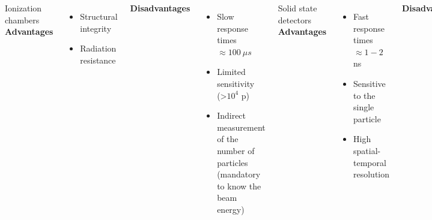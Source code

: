 \documentclass[aspectratio=169]{beamer}
\begin{document}
\begin{frame}
\begin{columns}
\begin{center}
			\end{center}
			{\color{blue} Ionization chambers}
			\newline
			\textbf{Advantages}
			\begin{itemize}
				\item Structural integrity
				\item Radiation resistance
			\end{itemize}
			\textbf{Disadvantages}
			\begin{itemize}
				\item Slow response times $\approx 100\:\mu s$
				\item Limited sensitivity (>$10^4$ p)
				\item Indirect measurement of the number of particles  (mandatory to know the beam energy)
			\end{itemize}
			{\color{blue} Solid state detectors}
			\newline
			\textbf{Advantages}
			\begin{itemize}
				\item Fast response times $\approx 1-2$ ns
				\item Sensitive to the single particle
				\item High spatial-temporal resolution
			\end{itemize}
			\textbf{Disadvantages}
			\begin{itemize}
				\item Complex and fast readout electronics
				\item Damage from radiation
				\item pile-up effects at high\newline rates
			\end{itemize}
		\end{columns}
	\end{frame}
\end{document}
